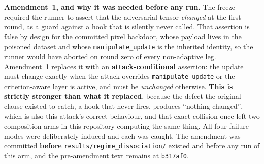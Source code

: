 \documentclass{article}
\begin{document}
\textbf{Amendment~1, and why it was needed before any run.} The freeze required the runner to assert that the adversarial tensor \emph{changed} at the first round, as a guard against a hook that is silently never called. That assertion is false by design for the committed pixel backdoor, whose payload lives in the poisoned dataset and whose \texttt{manipulate\_update} is the inherited identity, so the runner would have aborted on round zero of every non-adaptive leg. Amendment~1 replaces it with an \textbf{attack-conditional} assertion: the update must change exactly when the attack overrides \texttt{manipulate\_update} or the criterion-aware layer is active, and must be \emph{unchanged} otherwise. \textbf{This is strictly stronger than what it replaced}, because the defect the original clause existed to catch, a hook that never fires, produces ``nothing changed'', which is also this attack's correct behaviour, and that exact collision once left two composition arms in this repository computing the same thing. All four failure modes were deliberately induced and each was caught. The amendment was committed \textbf{before} \texttt{results/regime\_dissociation/} existed and before any run of this arm, and the pre-amendment text remains at \texttt{b317af0}.
\end{document}
